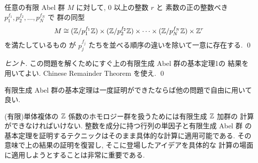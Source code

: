 \documentclass[12pt,twoside]{jarticle}
\begin{document}
\begin{theorem}[有限生成Abel群の基本定理2]
 任意の有限 Abel 群 $M$ に対して, %
 $0$ 以上の整数 $r$ と %
 素数の正の整数べき $p_1^{f_1}, p_2^{f_2},\ldots, p_N^{f_N}$ で
 群の同型
 \begin{equation*}
  M \cong 
  ({\mathbb Z}/p_1^{f_1}{\mathbb Z})\times({\mathbb Z}/p_2^{f_2}{\mathbb Z})\times\cdots\times({\mathbb Z}/p_N^{f_N}{\mathbb Z})
  \times{\mathbb Z}^r
 \end{equation*}
 を満たしているもの
 が $p_j^{f_j}$ たちを並べる順序の違いを除いて一意に存在する.
 \qed
\end{theorem}

\begin{proof}[ヒント]
この問題を解くためにすぐ上の有限生成 Abel 群の基本定理1の
結果を用いてよい. Chinese Remainder Theorem を使え.
\qed
\end{proof}

有限生成 Abel 群の基本定理は一度証明ができたならば他の問題で自由に用いて良い. 

\medskip


(有限)単体複体の ${\mathbb Z}$ 係数のホモロジー群を扱うためには有限生成 ${\mathbb Z}$ 加群の
計算ができなければいけない. 整数を成分に持つ行列の単因子と有限生成 Abel 群
の基本定理を証明するテクニックはそのまま具体的な計算に適用可能である.
その意味で上の結果の証明を復習し, そこに登場したアイデアを具体的な
計算の場面に適用しようとすることは非常に重要である.
\end{document}
